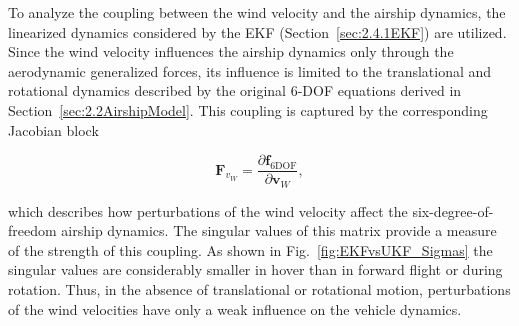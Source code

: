 To analyze the coupling between the wind velocity and the airship dynamics, the linearized dynamics considered by the EKF (Section~\ref{sec:2.4.1EKF}) are utilized.
Since the wind velocity influences the airship dynamics only through the aerodynamic generalized forces, its influence is limited to the translational and rotational dynamics described by the original 6-DOF equations derived in Section~\ref{sec:2.2AirshipModel}. This coupling is captured by the corresponding Jacobian block

\begin{equation}
	\bm{F}_{v_W} = \frac{\partial \bm{f}_{\mathrm{6DOF}}}{\partial \bm{v}_W},
\end{equation}

which describes how perturbations of the wind velocity affect the six-degree-of-freedom airship dynamics. The singular values of this matrix provide a measure of the strength of this coupling. As shown in Fig.~\ref{fig:EKFvsUKF_Sigmas} the singular values are considerably smaller in hover than in forward flight or during rotation.
Thus, in the absence of translational or rotational motion, perturbations of the wind velocities have only a weak influence on the vehicle dynamics.


